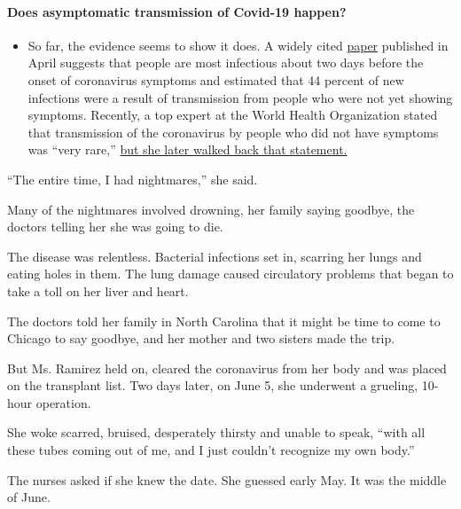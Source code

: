 \begin{itemize}
{  \paragraph{Does asymptomatic transmission of Covid-19
  happen?}\label{does-asymptomatic-transmission-of-covid-19-happen}}

  \begin{itemize}
  \tightlist
  \item
    So far, the evidence seems to show it does. A widely cited
    \href{https://www.nature.com/articles/s41591-020-0869-5}{paper}
    published in April suggests that people are most infectious about
    two days before the onset of coronavirus symptoms and estimated that
    44 percent of new infections were a result of transmission from
    people who were not yet showing symptoms. Recently, a top expert at
    the World Health Organization stated that transmission of the
    coronavirus by people who did not have symptoms was ``very rare,''
    \href{https://www.nytimes3xbfgragh.onion/2020/06/09/world/coronavirus-updates.html?action=click\&pgtype=Article\&state=default\&region=MAIN_CONTENT_3\&context=storylines_faq\#link-1f302e21}{but
    she later walked back that statement.}
  \end{itemize}
\end{itemize}

``The entire time, I had nightmares,'' she said.

Many of the nightmares involved drowning, her family saying goodbye, the
doctors telling her she was going to die.

The disease was relentless. Bacterial infections set in, scarring her
lungs and eating holes in them. The lung damage caused circulatory
problems that began to take a toll on her liver and heart.

The doctors told her family in North Carolina that it might be time to
come to Chicago to say goodbye, and her mother and two sisters made the
trip.

But Ms. Ramirez held on, cleared the coronavirus from her body and was
placed on the transplant list. Two days later, on June 5, she underwent
a grueling, 10-hour operation.

She woke scarred, bruised, desperately thirsty and unable to speak,
``with all these tubes coming out of me, and I just couldn't recognize
my own body.''

The nurses asked if she knew the date. She guessed early May. It was the
middle of June.

